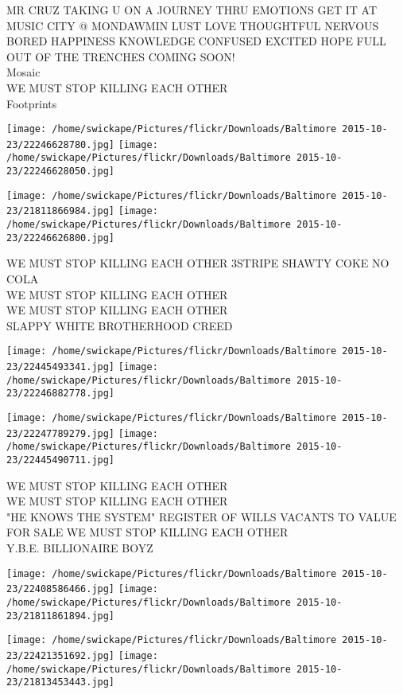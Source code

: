 \documentclass[10pt,letterpaper]{article}
\begin{document}
MR CRUZ TAKING U ON A JOURNEY THRU EMOTIONS GET IT AT MUSIC CITY @ MONDAWMIN LUST LOVE THOUGHTFUL NERVOUS BORED HAPPINESS KNOWLEDGE CONFUSED EXCITED HOPE FULL OUT OF THE TRENCHES COMING SOON!\\
Mosaic\\
WE MUST STOP KILLING EACH OTHER\\
Footprints
\pagebreak

\texttt{[image: /home/swickape/Pictures/flickr/Downloads/Baltimore 2015-10-23/22246628780.jpg]}
\texttt{[image: /home/swickape/Pictures/flickr/Downloads/Baltimore 2015-10-23/22246628050.jpg]}

\texttt{[image: /home/swickape/Pictures/flickr/Downloads/Baltimore 2015-10-23/21811866984.jpg]}
\texttt{[image: /home/swickape/Pictures/flickr/Downloads/Baltimore 2015-10-23/22246626800.jpg]}

WE MUST STOP KILLING EACH OTHER 3STRIPE SHAWTY COKE NO COLA\\
WE MUST STOP KILLING EACH OTHER\\
WE MUST STOP KILLING EACH OTHER\\
SLAPPY WHITE BROTHERHOOD CREED
\pagebreak

\texttt{[image: /home/swickape/Pictures/flickr/Downloads/Baltimore 2015-10-23/22445493341.jpg]}
\texttt{[image: /home/swickape/Pictures/flickr/Downloads/Baltimore 2015-10-23/22246882778.jpg]}

\texttt{[image: /home/swickape/Pictures/flickr/Downloads/Baltimore 2015-10-23/22247789279.jpg]}
\texttt{[image: /home/swickape/Pictures/flickr/Downloads/Baltimore 2015-10-23/22445490711.jpg]}

WE MUST STOP KILLING EACH OTHER\\
WE MUST STOP KILLING EACH OTHER\\
"HE KNOWS THE SYSTEM" REGISTER OF WILLS VACANTS TO VALUE FOR SALE WE MUST STOP KILLING EACH OTHER\\
Y.B.E. BILLIONAIRE BOYZ
\pagebreak

\texttt{[image: /home/swickape/Pictures/flickr/Downloads/Baltimore 2015-10-23/22408586466.jpg]}
\texttt{[image: /home/swickape/Pictures/flickr/Downloads/Baltimore 2015-10-23/21811861894.jpg]}

\texttt{[image: /home/swickape/Pictures/flickr/Downloads/Baltimore 2015-10-23/22421351692.jpg]}
\texttt{[image: /home/swickape/Pictures/flickr/Downloads/Baltimore 2015-10-23/21813453443.jpg]}
\end{document}
